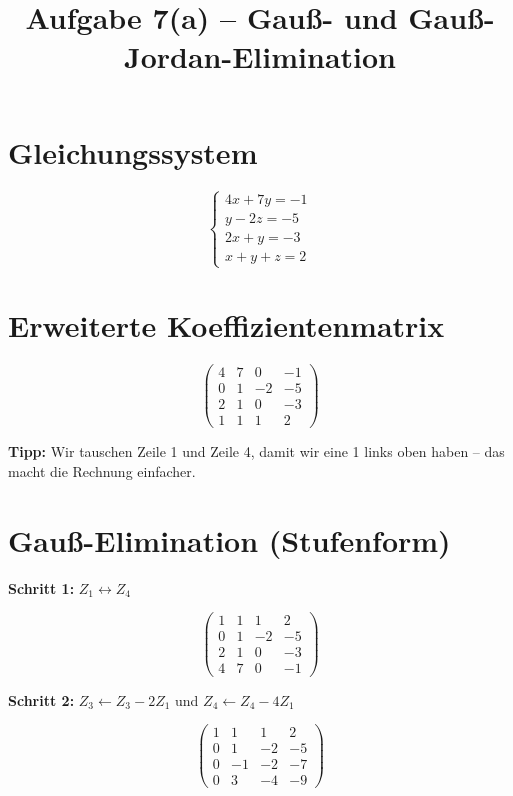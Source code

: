 \documentclass[a4paper,12pt]{article}
\title{Aufgabe 7(a) -- Gauß- und Gauß-Jordan-Elimination}
\author{}
\date{}
\begin{document}
\maketitle

\section*{Gleichungssystem}

\[
\begin{cases}
4x + 7y = -1 \\
y - 2z = -5 \\
2x + y = -3 \\
x + y + z = 2
\end{cases}
\]

\section*{Erweiterte Koeffizientenmatrix}

\[
\left(\begin{array}{ccc|c}
4 & 7 & 0 & -1 \\
0 & 1 & -2 & -5 \\
2 & 1 & 0 & -3 \\
1 & 1 & 1 & 2
\end{array}\right)
\]

\textbf{Tipp:} Wir tauschen Zeile 1 und Zeile 4, damit wir eine 1 links oben haben -- das macht die Rechnung einfacher.

\section*{Gauß-Elimination (Stufenform)}

\textbf{Schritt 1:} $Z_1 \leftrightarrow Z_4$

\[
\left(\begin{array}{ccc|c}
1 & 1 & 1 & 2 \\
0 & 1 & -2 & -5 \\
2 & 1 & 0 & -3 \\
4 & 7 & 0 & -1
\end{array}\right)
\]

\textbf{Schritt 2:} $Z_3 \leftarrow Z_3 - 2Z_1$ und $Z_4 \leftarrow Z_4 - 4Z_1$

\[
\left(\begin{array}{ccc|c}
1 & 1 & 1 & 2 \\
0 & 1 & -2 & -5 \\
0 & -1 & -2 & -7 \\
0 & 3 & -4 & -9
\end{array}\right)
\]
\end{document}
